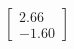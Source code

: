 \documentclass[preview]{standalone}
\begin{document}
\begin{align*}
\begin{bmatrix} 2.66 \\ -1.60 \end{bmatrix}
\end{align*}
\end{document}
